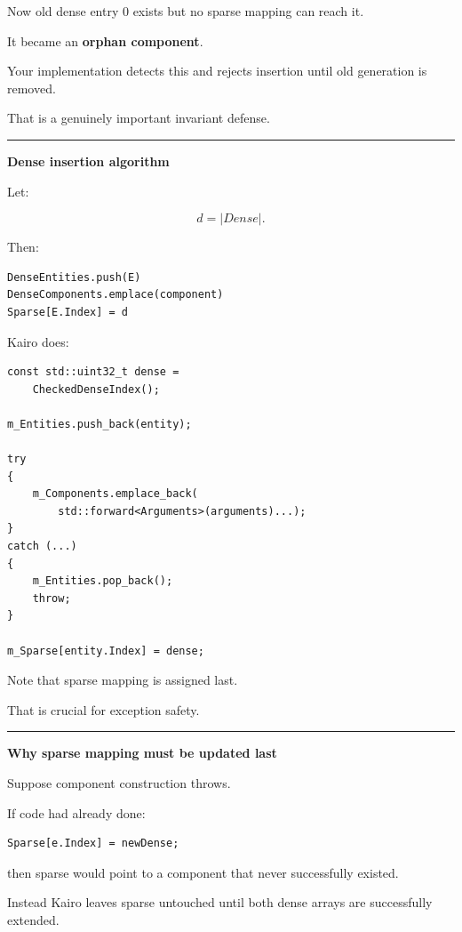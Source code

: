 Now old dense entry 0 exists but no sparse mapping can reach it.

It became an \textbf{orphan component}.

Your implementation detects this and rejects insertion until old generation is removed.

That is a genuinely important invariant defense.

\begin{center}\rule{0.5\linewidth}{0.5pt}\end{center}

\textbf{Dense insertion algorithm}

Let:

\[
d=|Dense|.
\]

Then:

\begin{verbatim}
DenseEntities.push(E)
DenseComponents.emplace(component)
Sparse[E.Index] = d
\end{verbatim}

Kairo does:

\begin{verbatim}
const std::uint32_t dense =
    CheckedDenseIndex();

m_Entities.push_back(entity);

try
{
    m_Components.emplace_back(
        std::forward<Arguments>(arguments)...);
}
catch (...)
{
    m_Entities.pop_back();
    throw;
}

m_Sparse[entity.Index] = dense;
\end{verbatim}

Note that sparse mapping is assigned last.

That is crucial for exception safety.

\begin{center}\rule{0.5\linewidth}{0.5pt}\end{center}

\textbf{Why sparse mapping must be updated last}

Suppose component construction throws.

If code had already done:

\begin{verbatim}
Sparse[e.Index] = newDense;
\end{verbatim}

then sparse would point to a component that never successfully existed.

Instead Kairo leaves sparse untouched until both dense arrays are successfully extended.

